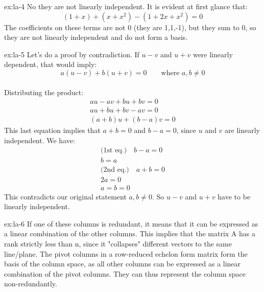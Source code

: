 \begin{solution}{ex:la-4}
  No they are not linearly independent. It is evident at first glance that:
  \[
    (1+x)+(x+x^2)-(1+2x+x^2)=0
  \]
  The coefficients on these terms are not 0 (they are 1,1,-1), but they sum to 0, so they are not linearly independent and do not form a basis.
\end{solution}
\begin{solution}{ex:la-5}
  Let's do a proof by contradiction. If $u-v$ and $u+v$ were linearly dependent, that would imply:
  \[
    a(u-v)+b(u+v)=0 \qquad\text{where } a,b\neq 0
  \]\\
  Distributing the product:
  \[
    \begin{gathered}
      au-av+bu+bv=0\\
      au+bu+bv-av=0\\
      (a+b)u+(b-a)v=0
    \end{gathered}
  \]
  This last equation implies that $a+b=0$ and $b-a=0$, since $u$ and $v$ are linearly independent. We have:
  \[
    \begin{gathered}
      \text{(1st eq.)}\quad b-a=0\\
      b=a\\
      \text{(2nd eq.)}\quad a+b=0\\
      2a=0\\
      a=b=0
    \end{gathered}
  \]
    This contradicts our original statement $a,b\neq 0$. So $u-v$ and $u+v$ have to be linearly independent.
\end{solution}

\begin{solution}{ex:la-6}
  If one of these columns is redundant, it means that it can be expressed as a linear combination of the other columns. This implies that the matrix A has a rank strictly less than n, since it "collapses" different vectors to the same line/plane.
  The pivot columns in a row-reduced echelon form matrix form the basis of the column space, as all other columns can be expressed as a linear combination of the pivot columns.
  They can thus represent the column space non-redundantly.
\end{solution}
